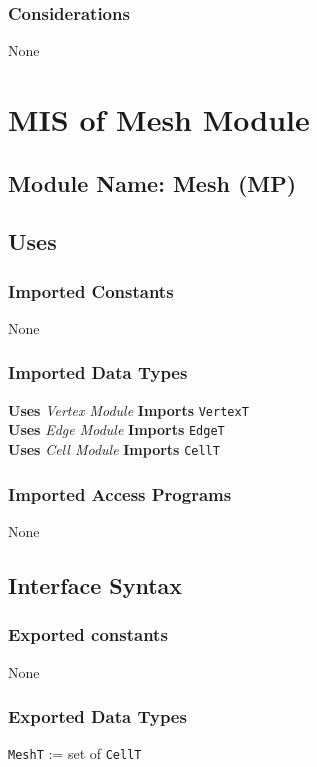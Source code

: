 \documentclass[12pt,titlepage]{article}
\begin{document}
\subsubsection{Considerations} None


\section{MIS of Mesh Module \label{AmisSecM}}

\subsection{Module Name: Mesh (MP)}

\subsection{Uses}
\subsubsection{Imported Constants} None
\subsubsection{Imported Data Types}  
{\bf Uses}  \emph{Vertex Module}  {\bf Imports}  \texttt{VertexT}  \\
{\bf Uses}  \emph{Edge Module}  {\bf Imports}  \texttt{EdgeT}  \\
{\bf Uses}  \emph{Cell Module}  {\bf Imports}  \texttt{CellT}  
\subsubsection{Imported Access Programs}None

\subsection{Interface Syntax}
\subsubsection{Exported constants} None
\subsubsection{Exported Data Types}
{\tt MeshT} := set of {\tt CellT}
\end{document}
